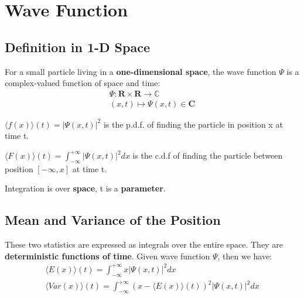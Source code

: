 \section{Wave Function}
\subsection{Definition in 1-D Space}
\begin{definition}
    For a small particle living in a \textbf{{one-dimensional space}}, the wave function $\Psi$ is a complex-valued function of space and time:
    $$
        \begin{gathered}
            \Psi: \mathbf{R} \times \mathbf{R} \rightarrow \mathbb{C} \\
            (x, t) \mapsto \Psi(x, t) \in \mathbf{C}
        \end{gathered}
    $$
\end{definition}

\begin{remark}
    $
        \langle f(x)\rangle(t) = |\Psi(x,t)|^2
    $
    is the p.d.f. of finding the particle in position x at time t.
\end{remark}
\begin{remark}
    $
        \langle F(x)\rangle(t) = \int_{-\infty}^{+\infty} |\Psi(x,t)|^2 dx
    $
    is the c.d.f of finding the particle between position $[-\infty, x]$ at time t.
\end{remark}
\begin{remark}
    Integration is over \textbf{space}, t is a \textbf{parameter}.
\end{remark}
\newpage
\subsection{Mean and Variance of the Position}
These two statistics are expressed as integrals over the entire space. They are \textbf{deterministic functions of time}. Given wave function $\Psi$, then we have: 
$$
\begin{gathered}
    \langle E(x)\rangle(t)=\int_{-\infty}^{+\infty} x|\Psi(x, t)|^{2} d x\\
    \langle Var(x)\rangle(t)=\int_{-\infty}^{+\infty}(x-\langle E(x)\rangle(t))^{2}|\Psi(x, t)|^{2} d x
\end{gathered}
$$
